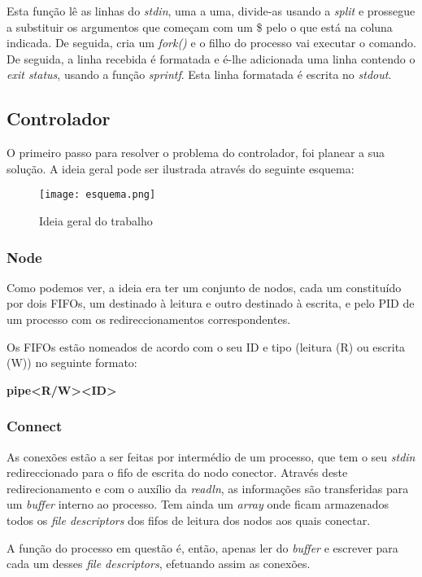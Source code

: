 \documentclass[a4paper]{article}
\begin{document}
Esta função lê as linhas do \textit{stdin}, uma a uma, divide-as usando a \textit{split} e prossegue a substituir os argumentos que começam com um \$ pelo o que está na coluna indicada. De seguida, cria um \textit{fork()} e o filho do processo vai executar o comando. De seguida, a linha recebida é formatada e é-lhe adicionada uma linha contendo o \textit{exit status}, usando a função \textit{sprintf}. Esta linha formatada é escrita no \textit{stdout}.

\subsection{Controlador}

O primeiro passo para resolver o problema do controlador, foi planear a sua solução. A ideia geral pode ser ilustrada através do seguinte esquema:

\begin{figure}[H]
	\centering
	\texttt{[image: esquema.png]}
	\caption{Ideia geral do trabalho}
	\label{fig:esquema}
\end{figure}

\subsubsection{Node}

Como podemos ver, a ideia era ter um conjunto de nodos, cada um constituído por dois FIFOs, um destinado à leitura e outro destinado à escrita, e pelo PID de um processo com os redireccionamentos correspondentes.

Os FIFOs estão nomeados de acordo com o seu ID e tipo (leitura (R) ou escrita (W)) no seguinte formato:

\textbf{pipe\textless R/W\textgreater\textless ID\textgreater}

\subsubsection{Connect}

As conexões estão a ser feitas por intermédio de um processo, que tem o seu \textit{stdin} redireccionado para o fifo de escrita do nodo conector. Através deste redirecionamento e com o auxílio da \textit{readln}, as informações são transferidas para um \textit{buffer} interno ao processo. Tem ainda um \textit{array} onde ficam armazenados todos os \textit{file descriptors} dos fifos de leitura dos nodos aos quais conectar.

A função do processo em questão é, então, apenas ler do \textit{buffer} e escrever para cada um desses \textit{file descriptors}, efetuando assim as conexões.
\end{document}
